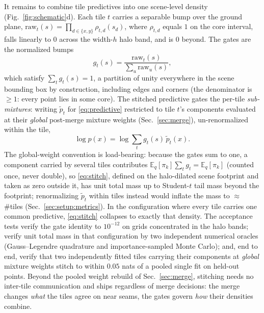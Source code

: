  It remains to combine tile predictives into one scene-level
density (Fig.~\ref{fig:schematic}d). Each tile $t$ carries a separable
bump over the
ground plane,
$\mathrm{raw}_t(s) = \prod_{d \in \{x,y\}} \rho_{t,d}(s_d)$, where
$\rho_{t,d}$ equals $1$ on the core interval, falls linearly to $0$
across the width-$h$ halo band, and is $0$ beyond. The
gates are the normalized bumps
\begin{equation}
g_t(s) = \frac{\mathrm{raw}_t(s)}{\sum_u \mathrm{raw}_u(s)},
\label{eq:gate}
\end{equation}
which satisfy $\sum_t g_t(s) = 1$, a partition of unity everywhere in
the scene bounding box by construction, including edges and corners
(the denominator is ${\ge}1$: every point lies in some core). The
stitched predictive gates the per-tile \emph{sub-mixtures}: writing
$\tilde{p}_t$ for \eqref{eq:predictive} restricted to tile $t$'s
components evaluated at their \emph{global} post-merge mixture weights
(Sec.~\ref{sec:merge}), un-renormalized within the tile,
\begin{equation}
\log p(x) = \log \sum_t g_t(s)\, \tilde{p}_t(x).
\label{eq:stitch}
\end{equation}
 The global-weight convention is load-bearing: because the gates sum
to one, a component carried by several tiles contributes
$\mathbb{E}_q[\pi_k]\sum_t g_t = \mathbb{E}_q[\pi_k]$ (counted
once, never double), so \eqref{eq:stitch}, defined on the
halo-dilated scene footprint and taken as zero outside it, has unit
total mass up to Student-$t$ tail mass beyond the footprint;
renormalizing $\tilde{p}_t$ within tiles instead would inflate the
mass to ${\approx}$\,\#tiles (Sec.~\ref{sec:setup:metrics}). In the configuration where every tile carries one
common predictive, \eqref{eq:stitch} collapses to exactly that density.
The acceptance tests verify the gate identity to
$10^{-12}$ on grids concentrated in the halo bands; verify unit total
mass in that configuration by two independent numerical oracles
(Gauss--Legendre quadrature and importance-sampled Monte Carlo); and,
end to end, verify that two independently fitted tiles carrying their
components at \emph{global} mixture weights stitch to within $0.05$
nats of a pooled single fit on held-out points. Beyond the pooled weight rebuild of Sec.~\ref{sec:merge}, stitching
needs no inter-tile communication and ships regardless of merge
decisions: the merge changes \emph{what} the tiles agree on near
seams, the gates govern \emph{how} their densities combine.

